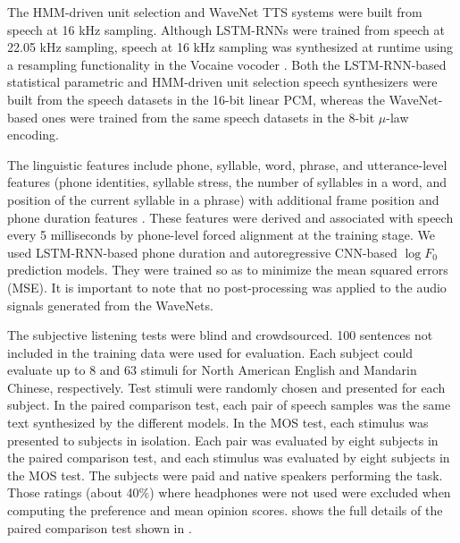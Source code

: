 
The HMM-driven unit selection and WaveNet TTS systems were built from speech at 16 kHz sampling.
Although LSTM-RNNs were trained from speech at 22.05 kHz sampling, 
speech at 16 kHz sampling was synthesized at runtime using a resampling functionality in the Vocaine vocoder \citep{Vocaine}.
Both the LSTM-RNN-based statistical parametric and HMM-driven unit selection speech synthesizers were built from the speech datasets in the 16-bit linear PCM, whereas the WaveNet-based ones were trained from the same speech datasets in the 8-bit $\mu$-law encoding.

The linguistic features include phone, syllable, word, phrase, and utterance-level features \citep{HTS_label} (\eg phone identities, syllable stress, the number of syllables in a word, and position of the current syllable
in a phrase) with additional frame position and phone duration features \citep{Zen_DNN_ICASSP}. These features were derived and associated with speech every 5 milliseconds by phone-level forced alignment at the training stage.
We used LSTM-RNN-based phone duration and autoregressive CNN-based $\log F_0$ prediction models.
They were trained so as to minimize the mean squared errors (MSE).
It is important to note that no post-processing was applied to the audio signals generated from the WaveNets.

The subjective listening tests were blind  and crowdsourced. 
100 sentences not included in the training data were used for evaluation.
Each subject could evaluate up to 8 and 63 stimuli for North American English and Mandarin Chinese, respectively.
Test stimuli were randomly chosen and presented for each subject.
In the paired comparison test, each pair of speech samples was the same text synthesized by the different models.
In the MOS test, each stimulus was presented to subjects in isolation.
Each pair was evaluated by eight subjects in the paired comparison test, and each stimulus was evaluated by eight subjects in the MOS test.
The subjects were paid and native speakers performing the task.
Those ratings (about 40\%) where headphones were not used were excluded when computing the preference and mean opinion scores.
 shows the full details of the paired comparison test shown in .


